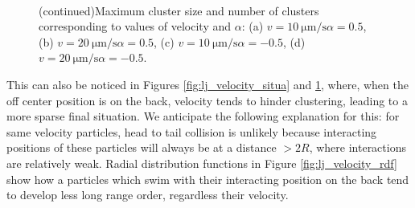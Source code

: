 \documentclass[../../master_thesis_np.tex]{subfiles}
\begin{document}
		\begin{figure}
			\centering
			\ContinuedFloat

			\\
			
			\caption{(continued)Maximum cluster size and number of clusters corresponding to values of velocity and $\alpha$: (a) $v = \SI{10}{\um \per \second} \alpha = 0.5$, (b) $v = \SI{20}{\um \per \second} \alpha = 0.5$, (c) $v = \SI{10}{\um \per \second} \alpha = -0.5$, (d) $v = \SI{20}{\um \per \second} \alpha = -0.5$.}
			\label{fig:lj_velocity_cluster}
		\end{figure}

		This can also be noticed in Figures \ref{fig:lj_velocity_situa} and \ref{fig:lj_velocity_cluster}, where, when the off center position is on the back, velocity tends to hinder clustering, leading to a more sparse final situation. 
		We anticipate the following explanation for this: for same velocity particles, head to tail collision is unlikely because interacting positions of these particles will always be at a distance $> 2R$, where interactions are relatively weak.
		Radial distribution functions in Figure \ref{fig:lj_velocity_rdf} show how a particles which swim with their interacting position on the back tend to develop less long range order, regardless their velocity.
		
\end{document}
